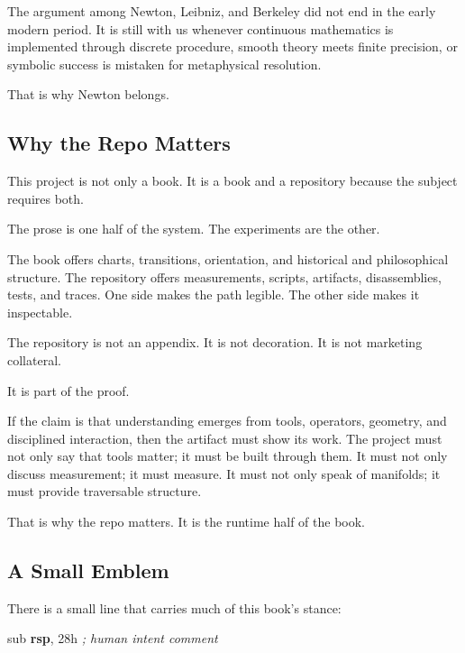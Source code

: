 \documentclass[
]{article}
\newenvironment{Shaded}{}{}
\newcommand{\BaseNTok}[1]{\textcolor[rgb]{0.25,0.63,0.44}{#1}}
\newcommand{\BuiltInTok}[1]{#1}
\newcommand{\CommentTok}[1]{\textcolor[rgb]{0.38,0.63,0.69}{\textit{#1}}}
\newcommand{\KeywordTok}[1]{\textcolor[rgb]{0.00,0.44,0.13}{\textbf{#1}}}
\begin{document}
The argument among Newton, Leibniz, and Berkeley did not end in the
early modern period. It is still with us whenever continuous mathematics
is implemented through discrete procedure, smooth theory meets finite
precision, or symbolic success is mistaken for metaphysical resolution.

That is why Newton belongs.

\hypertarget{why-the-repo-matters}{%
\subsection{Why the Repo Matters}\label{why-the-repo-matters}}

This project is not only a book. It is a book and a repository because
the subject requires both.

The prose is one half of the system. The experiments are the other.

The book offers charts, transitions, orientation, and historical and
philosophical structure. The repository offers measurements, scripts,
artifacts, disassemblies, tests, and traces. One side makes the path
legible. The other side makes it inspectable.

The repository is not an appendix. It is not decoration. It is not
marketing collateral.

It is part of the proof.

If the claim is that understanding emerges from tools, operators,
geometry, and disciplined interaction, then the artifact must show its
work. The project must not only say that tools matter; it must be built
through them. It must not only discuss measurement; it must measure. It
must not only speak of manifolds; it must provide traversable structure.

That is why the repo matters. It is the runtime half of the book.

\hypertarget{a-small-emblem}{%
\subsection{A Small Emblem}\label{a-small-emblem}}

There is a small line that carries much of this book's stance:

\begin{Shaded}
\begin{Highlighting}[]
\BuiltInTok{sub} \KeywordTok{rsp}\BaseNTok{, 28h      }\CommentTok{; human intent comment}
\end{Highlighting}
\end{Shaded}
\end{document}
